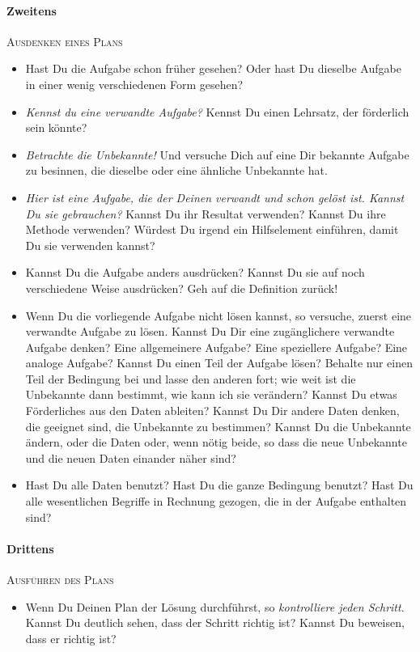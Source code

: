 \documentclass
[
  fontsize = 11pt,
  parskip  = half-,
  BCOR     = 0pt,
  DIV      = 11,
  draft,
  ngerman
]
{scrartcl}
\begin{document}
\paragraph{Zweitens}\textsc{Ausdenken eines Plans}
\begin{itemize}
  \renewcommand{\itemsep}{-0.5ex}
  \item Hast Du die Aufgabe schon früher gesehen? Oder hast Du dieselbe Aufgabe in einer
        wenig verschiedenen Form gesehen?
  \item \textit{Kennst du eine verwandte Aufgabe?} Kennst Du einen Lehrsatz, der förderlich
        sein könnte?
  \item \textit{Betrachte die Unbekannte!} Und versuche Dich auf eine Dir bekannte Aufgabe
        zu besinnen, die dieselbe oder eine ähnliche Unbekannte hat.
  \item \textit{Hier ist eine Aufgabe, die der Deinen verwandt und schon gelöst ist. Kannst Du sie
        gebrauchen?} Kannst Du ihr Resultat verwenden? Kannst Du ihre Methode verwenden?
        Würdest Du irgend ein Hilfselement einführen, damit Du sie verwenden kannst?
  \item Kannst Du die Aufgabe anders ausdrücken? Kannst Du sie auf noch verschiedene Weise
        ausdrücken? Geh auf die Definition zurück!
  \item Wenn Du die vorliegende Aufgabe nicht lösen kannst, so versuche, zuerst eine verwandte
        Aufgabe zu lösen. Kannst Du Dir eine zugänglichere verwandte Aufgabe denken? Eine
        allgemeinere Aufgabe? Eine speziellere Aufgabe? Eine analoge Aufgabe? Kannst Du einen Teil
        der Aufgabe lösen? Behalte nur einen Teil der Bedingung bei und lasse den anderen fort; wie
        weit ist die Unbekannte dann bestimmt, wie kann ich sie verändern? Kannst Du etwas
        Förderliches aus den Daten ableiten? Kannst Du Dir andere Daten denken, die geeignet sind,
        die Unbekannte zu bestimmen? Kannst Du die Unbekannte ändern, oder die Daten oder, wenn
        nötig beide, so dass die neue Unbekannte und die neuen Daten einander näher sind?
  \item Hast Du alle Daten benutzt? Hast Du die ganze Bedingung benutzt? Hast Du alle wesentlichen
        Begriffe in Rechnung gezogen, die in der Aufgabe enthalten sind?
\end{itemize}

\paragraph{Drittens}\textsc{Ausführen des Plans}
\begin{itemize}
  \renewcommand{\itemsep}{-0.5ex}
  \item Wenn Du Deinen Plan der Lösung durchführst, so \textit{kontrolliere jeden Schritt}. Kannst
        Du deutlich sehen, dass der Schritt richtig ist? Kannst Du beweisen, dass er richtig ist?
\end{itemize}
\end{document}
